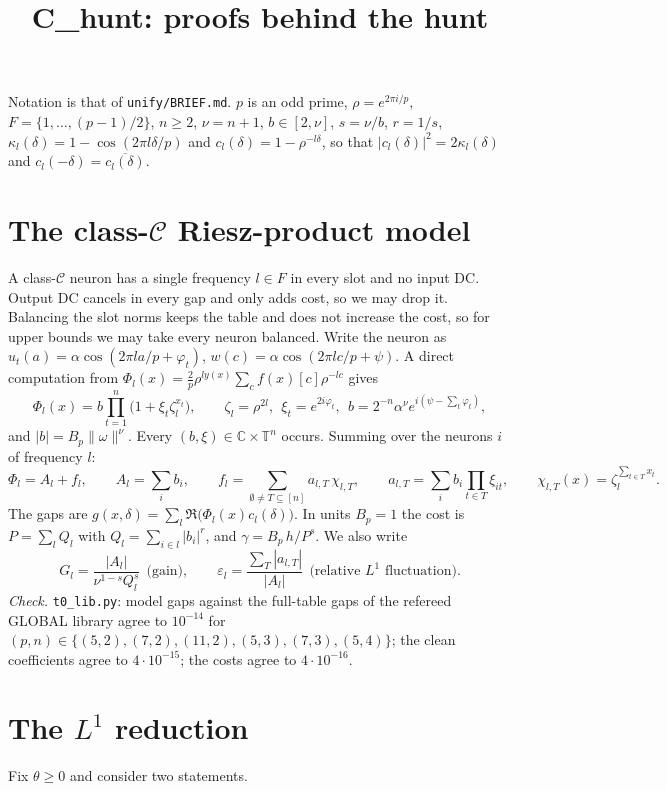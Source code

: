 \documentclass[11pt]{article}
\title{C\_hunt: proofs behind the hunt}
\date{}
\theoremstyle{remark}
\begin{document}
\maketitle

\noindent Notation is that of \texttt{unify/BRIEF.md}.  $p$ is an odd prime, $\rho=e^{2\pi i/p}$, $F=\{1,\dots,(p-1)/2\}$, $n\ge2$,
$\nu=n+1$, $b\in[2,\nu]$, $s=\nu/b$, $r=1/s$, $\kappa_l(\delta)=1-\cos(2\pi l\delta/p)$ and $c_l(\delta)=1-\rho^{-l\delta}$, so that
$|c_l(\delta)|^2=2\kappa_l(\delta)$ and $c_l(-\delta)=\overline{c_l(\delta)}$.

\section{The class-$\mathcal C$ Riesz-product model}
A class-$\mathcal C$ neuron has a single frequency $l\in F$ in every slot and no input DC.  Output DC cancels in every gap and only adds
cost, so we may drop it.  Balancing the slot norms keeps the table and does not increase the cost, so for upper bounds
we may take every neuron balanced.  Write the neuron as $u_t(a)=\alpha\cos(2\pi la/p+\varphi_t)$, $w(c)=\alpha\cos(2\pi lc/p+\psi)$.
A direct computation from $\Phi_l(x)=\frac2p\rho^{l y(x)}\sum_cf(x)[c]\rho^{-lc}$ gives
\[
\Phi_l(x)=b\prod_{t=1}^n\big(1+\xi_t\zeta_l^{x_t}\big),\qquad \zeta_l=\rho^{2l},\ \ \xi_t=e^{2i\varphi_t},\ \ b=2^{-n}\alpha^{\nu}e^{i(\psi-\sum_t\varphi_t)},
\]
and $|b|=B_p\|\omega\|^{\nu}$.  Every $(b,\xi)\in\mathbb C\times\mathbb T^n$ occurs.  Summing over the neurons $i$ of frequency $l$:
\[
\Phi_l=A_l+f_l,\qquad A_l=\sum_ib_i,\qquad f_l=\sum_{\emptyset\ne T\subseteq[n]}a_{l,T}\,\chi_{l,T},\qquad a_{l,T}=\sum_ib_i\prod_{t\in T}\xi_{it},
\qquad \chi_{l,T}(x)=\zeta_l^{\sum_{t\in T}x_t}.
\]
The gaps are $g(x,\delta)=\sum_l\Re\big(\Phi_l(x)c_l(\delta)\big)$.  In units $B_p=1$ the cost is $P=\sum_l Q_l$ with $Q_l=\sum_{i\in l}|b_i|^r$,
and $\gamma=B_p\,h/P^s$.  We also write
\[
G_l=\frac{|A_l|}{\nu^{1-s}Q_l^s}\ \ \text{(gain)},\qquad \varepsilon_l=\frac{\sum_T|a_{l,T}|}{|A_l|}\ \ \text{(relative $L^1$ fluctuation)}.
\]
\emph{Check.} \texttt{t0\_lib.py}: model gaps against the full-table gaps of the refereed GLOBAL library agree to $10^{-14}$
for $(p,n)\in\{(5,2),(7,2),(11,2),(5,3),(7,3),(5,4)\}$; the clean coefficients agree to $4\cdot10^{-15}$; the costs agree to $4\cdot10^{-16}$.

\section{The $L^1$ reduction}
Fix $\theta\ge0$ and consider two statements.
\end{document}
